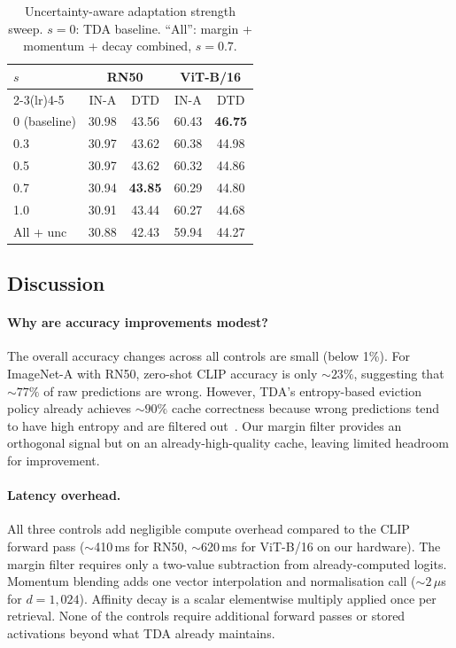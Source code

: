 \documentclass[10pt,twocolumn,letterpaper]{article}
\newcommand{\best}[1]{\textbf{#1}}
\begin{document}
\begin{table}[t]
\centering\small\setlength{\tabcolsep}{4pt}
\caption{Uncertainty-aware adaptation strength sweep.
  $s{=}0$: TDA baseline.
  ``All'': margin + momentum + decay combined, $s{=}0.7$.}
\label{tab:unc}
\begin{tabular}{lcccc}
\toprule
$s$ & \multicolumn{2}{c}{RN50} & \multicolumn{2}{c}{ViT-B/16} \\
\cmidrule(lr){2-3}\cmidrule(lr){4-5}
 & IN-A & DTD & IN-A & DTD \\
\midrule
0 (baseline) & 30.98 & 43.56 & 60.43 & \best{46.75} \\
0.3          & 30.97 & 43.62 & 60.38 & 44.98 \\
0.5          & 30.97 & 43.62 & 60.32 & 44.86 \\
0.7          & 30.94 & \best{43.85} & 60.29 & 44.80 \\
1.0          & 30.91 & 43.44 & 60.27 & 44.68 \\
\midrule
All + unc    & 30.88 & 42.43 & 59.94 & 44.27 \\
\bottomrule
\end{tabular}
\end{table}

\subsection{Discussion}
\label{subsec:disc}

\paragraph{Why are accuracy improvements modest?}
The overall accuracy changes across all controls are small
(below 1\%).
For ImageNet-A with RN50, zero-shot CLIP accuracy is only
$\sim\!23\%$, suggesting that $\sim\!77\%$ of raw predictions are
wrong.
However, TDA's entropy-based eviction policy already achieves
$\sim\!90\%$ cache correctness because wrong predictions tend to have
high entropy and are filtered out~\cite{karmanov2024tda}.
Our margin filter provides an orthogonal signal but on an
already-high-quality cache, leaving limited headroom for improvement.

\paragraph{Latency overhead.}
All three controls add negligible compute overhead compared to the
CLIP forward pass ($\sim$410\,ms for RN50, $\sim$620\,ms for
ViT-B/16 on our hardware).
The margin filter requires only a two-value subtraction from
already-computed logits.
Momentum blending adds one vector interpolation and normalisation
call (${\sim}2\,\mu$s for $d{=}1{,}024$).
Affinity decay is a scalar elementwise multiply applied once per
retrieval.
None of the controls require additional forward passes or stored
activations beyond what TDA already maintains.
\end{document}
